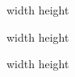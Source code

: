 %
\ifx\fmtname\undefined
  
  \def\fmtname{basic}
  \expandafter\dump
\fi


\pdfximage width \hsize height 
\hbox{\pdfrefximage\pdflastximage}
\eject

\pdfximage width \hsize height 
\hbox{\pdfrefximage\pdflastximage}
\eject

\pdfximage width \hsize height 
\hbox{\pdfrefximage\pdflastximage}
\eject

\bye
